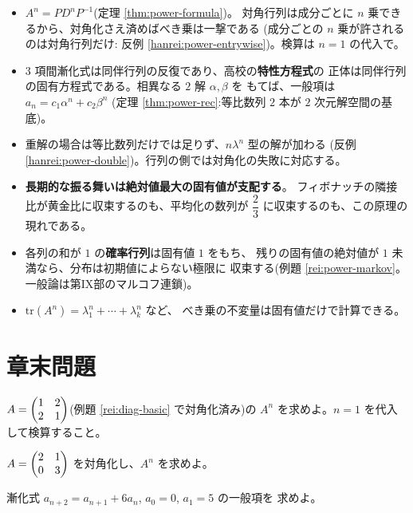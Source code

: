 \begin{matome}
\begin{itemize}
\item \textbf{$A^n = PD^nP^{-1}$}(定理 \ref{thm:power-formula})。
対角行列は成分ごとに $n$ 乗できるから、対角化さえ済めばべき乗は一撃である
(成分ごとの $n$ 乗が許されるのは対角行列だけ:
反例 \ref{hanrei:power-entrywise})。検算は $n = 1$ の代入で。
\item $3$ 項間漸化式は同伴行列の反復であり、高校の\textbf{特性方程式}の
正体は同伴行列の固有方程式である。相異なる $2$ 解 $\alpha, \beta$ を
もてば、一般項は $a_n = c_1\alpha^n + c_2\beta^n$
(定理 \ref{thm:power-rec}:等比数列 $2$ 本が $2$ 次元解空間の基底)。
\item 重解の場合は等比数列だけでは足りず、$n\lambda^n$ 型の解が加わる
(反例 \ref{hanrei:power-double})。行列の側では対角化の失敗に対応する。
\item \textbf{長期的な振る舞いは絶対値最大の固有値が支配する}。
フィボナッチの隣接比が黄金比に収束するのも、平均化の数列が
$\dfrac{2}{3}$ に収束するのも、この原理の現れである。
\item 各列の和が $1$ の\textbf{確率行列}は固有値 $1$ をもち、
残りの固有値の絶対値が $1$ 未満なら、分布は初期値によらない極限に
収束する(例題 \ref{rei:power-markov}。一般論は第IX部のマルコフ連鎖)。
\item $\mathrm{tr}(A^n) = \lambda_1^n + \cdots + \lambda_k^n$ など、
べき乗の不変量は固有値だけで計算できる。
\end{itemize}
\end{matome}

\section*{章末問題}

\begin{mondai}[基本]\label{q:power-ex1}
$A = \begin{pmatrix}1 & 2 \\ 2 & 1\end{pmatrix}$(例題 \ref{rei:diag-basic} で対角化済み)の
$A^n$ を求めよ。$n = 1$ を代入して検算すること。
\end{mondai}

\begin{mondai}[基本]\label{q:power-ex2}
$A = \begin{pmatrix}2 & 1 \\ 0 & 3\end{pmatrix}$ を対角化し、$A^n$ を求めよ。
\end{mondai}

\begin{mondai}[基本]\label{q:power-ex3}
漸化式 $a_{n+2} = a_{n+1} + 6a_n$, $a_0 = 0$, $a_1 = 5$ の一般項を
求めよ。
\end{mondai}

